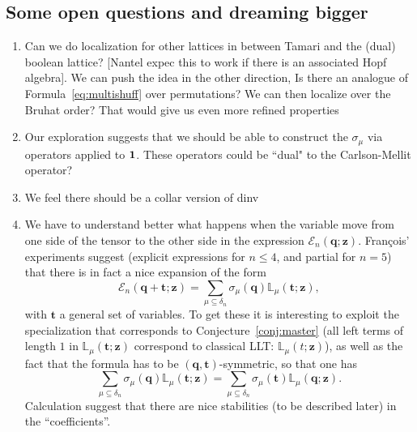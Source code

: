 \documentclass[12pt]{amsart}
\theoremstyle{plain}
\theoremstyle{definition}
\theoremstyle{remark}
\newcommand{\Qvar}{{\bm q}}
\newcommand{\Zvar}{{\bm z}}
\begin{document}
\subsection{Some open questions and dreaming bigger}

\begin{enumerate}
\item Can we do localization for other lattices in between Tamari and the (dual) boolean lattice? [Nantel expec this to work if there is an associated Hopf algebra]. We can push the idea in the other direction, Is there an analogue of Formula~\eqref{eq:multishuff} over permutations? We can then localize over the Bruhat order? That would give us even more refined properties
\item Our exploration suggests that we should be able to construct the $\sigma_\mu$ via operators applied to $\bf 1$. These operators could be ``dual" to the Carlson-Mellit operator?
\item We feel there should be a collar version of dinv
\item We have to understand better what happens when the variable move from one side of the tensor to the other side in the expression ${\mathcal E}_n(\Qvar;\Zvar)$. Fran\c{c}ois' experiments suggest (explicit expressions for $n\leq 4$, and partial for $n=5$) that there is in fact a nice expansion of the form
\begin{equation}
    \mathcal{E}_n(\bm{q}+\bm{t};\bm{z}) = \sum_{\mu\subseteq \delta_n} \sigma_\mu(\bm{q}) \mathbb{L}_\mu(\bm{t};\bm{z}),
  \end{equation}
  with $\bm{t}$ a general set of variables. To get these it is interesting to exploit the specialization that corresponds to  Conjecture~\ref{conj:master} (all left terms of length $1$ in $\mathbb{L}_\mu(\bm{t};\bm{z})$ correspond to classical LLT: $\mathbb{L}_\mu(t;\bm{z})$), as well as the fact that 
  the formula has to be $(\bm{q},\bm{t})$-symmetric, so that one has 
     $$\sum_{\mu\subseteq \delta_n} \sigma_\mu(\bm{q}) \mathbb{L}_\mu(\bm{t};\bm{z})=\sum_{\mu\subseteq \delta_n} \sigma_\mu(\bm{t}) \mathbb{L}_\mu(\bm{q};\bm{z}).$$
     Calculation suggest that there are nice stabilities (to be described later) in the ``coefficients''.
\end{enumerate}
\end{document}
